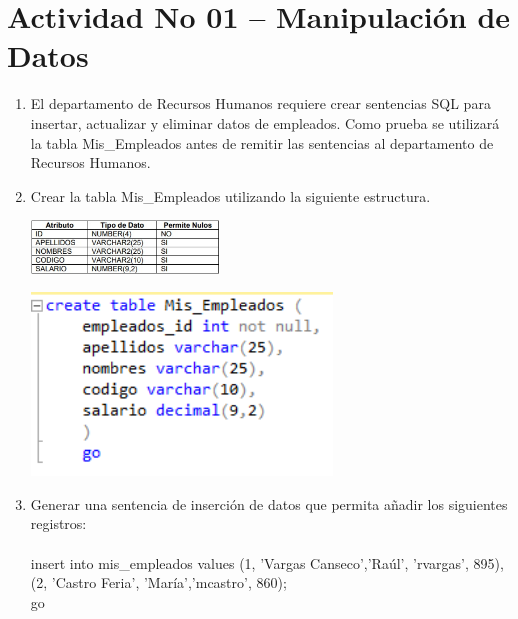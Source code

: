 \section{Actividad No 01 – Manipulaci\'on de Datos} 

\begin{enumerate}[1.]
	\item El departamento de Recursos Humanos requiere crear sentencias SQL para insertar, actualizar y eliminar datos de empleados. Como prueba se utilizará la tabla Mis\_Empleados antes de remitir las sentencias al departamento de Recursos Humanos.

	\item Crear la tabla Mis\_Empleados utilizando la siguiente estructura.
	\begin{center}
	\includegraphics[width=5cm]{./Imagenes/imagen0102} 
	\end{center}
	\begin{center}
	\includegraphics[width=8cm]{./Imagenes/1} 
	\end{center}
	\item Generar una sentencia de inserción de datos que permita añadir los siguientes registros:
	\\
	\\ insert into mis\_empleados values (1, 'Vargas Canseco','Raúl', 'rvargas', 895),(2, 'Castro Feria',  'María','mcastro', 860);
	\\ go


\end{enumerate}
